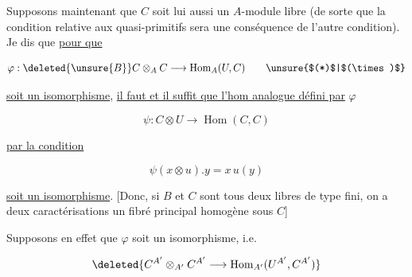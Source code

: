 

Supposons maintenant que $C$ soit lui aussi un $A$-module libre (de sorte que la condition relative aux quasi-primitifs sera une conséquence de l'autre condition). Je dis que \uline{pour que} \deleted{$\varphi$}

\[
\varphi:\deleted{\unsure{B}}C\otimes_A C\longrightarrow\operatorname{Hom}_A(U,C)\tag*{\unsure{$(*)$|$(\times)$}}
\]

\uline{soit un isomorphisme}, \uline{il faut et il suffit que l'hom analogue défini par} $\varphi$

\[
\psi:C\otimes U\longrightarrow\operatorname{Hom}(C,C)\tag*{$(**)$}
\]

\uline{par la condition}

\[
\boxed{\psi(x\otimes u).y=x\,u(y)}
\]


\uline{soit un isomorphisme}. [Donc, si $B$ et $C$ sont tous deux libres de type fini, on a deux caractérisations     un fibré principal homogène sous $C$]

Supposons en effet que $\varphi$ soit un isomorphisme, i.e. 

\[
\deleted{C^{A'}\otimes_{A'}C^{A'}\longrightarrow\operatorname{Hom}_{A'}(U^{A'},C^{A'})}
\]

